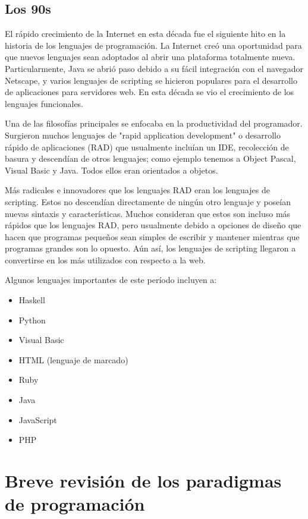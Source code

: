 \documentclass[a4paper,10pt]{article}
\begin{document}
\subsection{Los 90s}

El rápido crecimiento de la Internet en esta década fue el siguiente hito en la historia de los lenguajes de programación. La Internet creó una oportunidad para que nuevos lenguajes sean adoptados al abrir una plataforma totalmente nueva. Particularmente, Java se abrió paso debido a su fácil integración con el navegador Netscape, y varios lenguajes de scripting se hicieron populares para el desarrollo de aplicaciones para servidores web. En esta década se vio el crecimiento de los lenguajes funcionales. 

Una de las filosofías principales se enfocaba en la productividad del programador. Surgieron muchos lenguajes de "rapid application development" o desarrollo rápido de aplicaciones (RAD) que usualmente incluían un IDE, recolección de basura y descendían de otros lenguajes; como ejemplo tenemos a Object Pascal, Visual Basic y Java. Todos ellos eran orientados a objetos.

Más radicales e innovadores que los lenguajes RAD eran los lenguajes de scripting. Estos no descendían directamente de ningún otro lenguaje y poseían nuevas sintaxis y características. Muchos consideran que estos son incluso más rápidos que los lenguajes RAD, pero usualmente debido a opciones de diseño que hacen que programas pequeños sean simples de escribir y mantener mientras que programas grandes son lo opuesto. Aún así, los lenguajes de scripting llegaron a convertirse en los más utilizados con respecto a la web.

Algunos lenguajes importantes de este período incluyen a:

\begin{itemize}
\item Haskell
\item Python
\item Visual Basic
\item HTML (lenguaje de marcado)
\item Ruby
\item Java
\item JavaScript
\item PHP
\end{itemize}

\section{Breve revisión de los paradigmas de programación}
\end{document}

